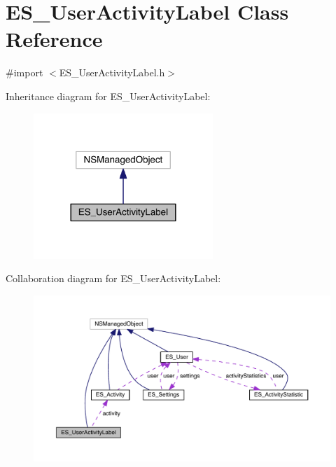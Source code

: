 \hypertarget{interface_e_s___user_activity_label}{\section{E\+S\+\_\+\+User\+Activity\+Label Class Reference}
\label{interface_e_s___user_activity_label}
}


{\ttfamily \#import $<$E\+S\+\_\+\+User\+Activity\+Label.\+h$>$}



Inheritance diagram for E\+S\+\_\+\+User\+Activity\+Label\+:\nopagebreak
\begin{figure}[H]
\begin{center}
\leavevmode
\includegraphics[width=192pt]{d8/dd8/interface_e_s___user_activity_label__inherit__graph}
\end{center}
\end{figure}


Collaboration diagram for E\+S\+\_\+\+User\+Activity\+Label\+:\nopagebreak
\begin{figure}[H]
\begin{center}
\leavevmode
\includegraphics[width=350pt]{df/d4e/interface_e_s___user_activity_label__coll__graph}
\end{center}
\end{figure}
